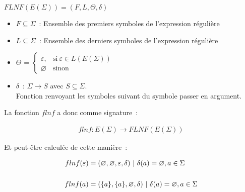 \vphantom{}

\begin{center}
    \(FLNF(E(\Sigma)) = (F, L, \Theta, \delta)\)

    \begin{itemize}
        \item[\textbullet] \(F \subseteq \Sigma\)~: Ensemble des premiers
            symboles de l'expression régulière

            \vphantom{}

        \item[\textbullet] \(L \subseteq \Sigma\)~: Ensemble des derniers
            symboles de l'expression régulière

            \vphantom{}

        \item[\textbullet] \(\Theta\) =
            \(
            \begin{cases}
                \varepsilon, & \text{si}~ \varepsilon \in L(E(\Sigma)) \\
                \varnothing  & \text{sinon}
            \end{cases}
            \)

            \vphantom{}

        \item[\textbullet] \(\delta\)~: \(\Sigma \to S\) avec \(S \subseteq
            \Sigma\). \\
            Fonction renvoyant les symboles suivant du symbole passer en argument.
    \end{itemize}
\end{center}

La fonction \(flnf\) a donc comme signature~:

\begin{align}
    flnf: E(\Sigma) \to FLNF(E(\Sigma))
\end{align}

Et peut-être calculée de cette manière~:

\begin{align}
    flnf(\varepsilon) & = (\varnothing, \varnothing, \varepsilon, \delta) ~|~ \delta(a) = \varnothing, a \in \Sigma \\
    \vphantom{} \notag                                                                                              \\
    flnf(a)           & = (\{a\}, \{a\}, \varnothing, \delta) ~|~ \delta(a) = \varnothing, a
    \in \Sigma
\end{align}

